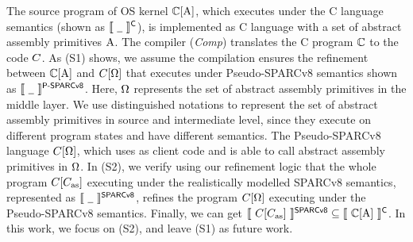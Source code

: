 

The source program of OS kernel
$\mathbb{C}[\text{A}]$, which executes
under the C language semantics (shown as
$\llbracket \ {\underline{\ \,}} \ \rrbracket^{\textsf{C}}$),
is implemented as C language
with a set of abstract assembly primitives $\text{A}$.
The compiler (\textit{Comp}) translates the
C program $\mathbb{C}$ to the \sparc{} code $C$.
As {\color{blue} (S1)} shows,
we assume the compilation ensures the
refinement between $\mathbb{C}[\text{A}]$ and
$C[\Omega]$ that
executes under Pseudo-SPARCv8 semantics shown as
$\llbracket \ {\underline{\ \,}} \ \rrbracket^{\textsf{P-SPARCv8}}$.
Here, $\Omega$ represents the set of
abstract assembly primitives in the middle layer.
We use distinguished notations to represent
the set of abstract assembly primitives in source
and intermediate level, since they execute on
different program states and have different semantics.
The Pseudo-SPARCv8 language $C[\Omega]$,
which uses \sparc{} as client code and is able to
call abstract assembly primitives in $\Omega$.
In {\color{blue} (S2)},
we verify using our refinement logic that
the whole \sparc{} program
$C[C_{\text{as}}]$ executing under the realistically
modelled SPARCv8 semantics, represented as
$\llbracket \ {\underline{\ \,}} \ \rrbracket^{\textsf{SPARCv8}}$, refines
the program $C[\Omega]$ executing
under the Pseudo-SPARCv8 semantics.
Finally, we can get
$\llbracket \ {C[C_{\text{as}}]} \ \rrbracket^{\textsf{SPARCv8}}
\subseteq
\llbracket \ {\mathbb{C}[\text{A}]} \ \rrbracket^{\textsf{C}}$.
In this work, we focus on
{\color{blue} (S2)}, and
leave {\color{blue} (S1)}
as future work.

